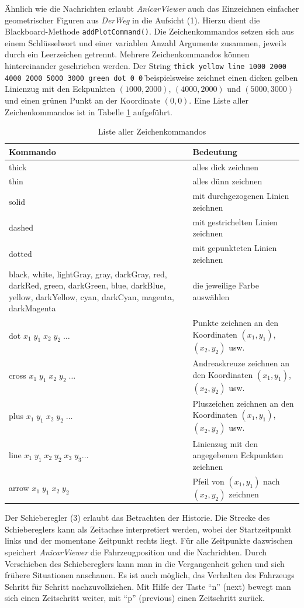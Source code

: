 \documentclass[a4paper, 11pt]{article}
\newcommand{\code}[1]{\texttt{#1}}
\newcommand{\DerWeg}{\textit{DerWeg }}  %
\newcommand{\AnicarViewer}{\textit{AnicarViewer }}  %
\begin{document}
{Ähnlich wie die Nachrichten erlaubt \AnicarViewer auch das Einzeichnen einfacher geometrischer Figuren aus \DerWeg in die Aufsicht (1). Hierzu dient die Blackboard-Methode \code{addPlotCommand()}. Die Zeichenkommandos setzen sich aus einem Schlüsselwort und einer variablen Anzahl Argumente zusammen, jeweils durch ein Leerzeichen getrennt. Mehrere Zeichenkommandos können hintereinander geschrieben werden. Der String \texttt{\"{}thick yellow line 1000 2000 4000 2000 5000 3000 green dot 0 0\"{}} beispielsweise zeichnet einen dicken gelben Linienzug mit den Eckpunkten $(1000, 2000)$, $(4000,2000)$ und $(5000,3000)$ und einen grünen Punkt an der Koordinate $(0,0)$. Eine Liste aller Zeichenkommandos ist in Tabelle \ref{tab:plotcmd} aufgeführt.

\begin{table}
\centering
\begin{tabular}{|p{7cm}|p{8cm}|}
\hline
Kommando & Bedeutung \\
\hline
thick & alles dick zeichnen \\
thin & alles dünn zeichnen \\
\hline
solid & mit durchgezogenen Linien zeichnen \\
dashed & mit gestrichelten Linien zeichnen \\
dotted & mit gepunkteten Linien zeichnen \\
\hline
black, white, lightGray, gray, darkGray, red, darkRed, green, darkGreen, blue, darkBlue, yellow, darkYellow, cyan, darkCyan, magenta, darkMagenta & die jeweilige Farbe auswählen \\
\hline
dot $x_1\;y_1\;x_2\;y_2\;\dots$ & Punkte zeichnen an den Koordinaten $(x_1,y_1)$, $(x_2,y_2)$ usw. \\
cross $x_1\;y_1\;x_2\;y_2\;\dots$ & Andreaskreuze zeichnen an den Koordinaten $(x_1,y_1)$, $(x_2,y_2)$ usw. \\
plus $x_1\;y_1\;x_2\;y_2\;\dots$ & Pluszeichen zeichnen an den Koordinaten $(x_1,y_1)$, $(x_2,y_2)$ usw. \\
line $x_1\;y_1\;x_2\;y_2\;x_3\;y_3\dots$ & Linienzug mit den angegebenen Eckpunkten zeichnen \\
arrow $x_1\;y_1\;x_2\;y_2$ & Pfeil von $(x_1,y_1)$ nach $(x_2,y_2)$ zeichnen \\
\hline
\end{tabular}
\caption{Liste aller Zeichenkommandos}
\label{tab:plotcmd}
\end{table}

Der Schieberegler (3) erlaubt das Betrachten der Historie. Die Strecke des Schiebereglers kann als Zeitachse interpretiert werden, wobei der Startzeitpunkt links und der momentane Zeitpunkt rechts liegt. Für alle Zeitpunkte dazwischen speichert \AnicarViewer die Fahrzeugposition und die Nachrichten. Durch Verschieben des Schiebereglers kann man in die Vergangenheit gehen und sich frühere Situationen anschauen. Es ist auch möglich, das Verhalten des Fahrzeugs Schritt für Schritt nachzuvollziehen. Mit Hilfe der Taste "`n"' (next) bewegt man sich einen Zeitschritt weiter, mit "`p"' (previous) einen Zeitschritt zurück.

}
\end{document}
